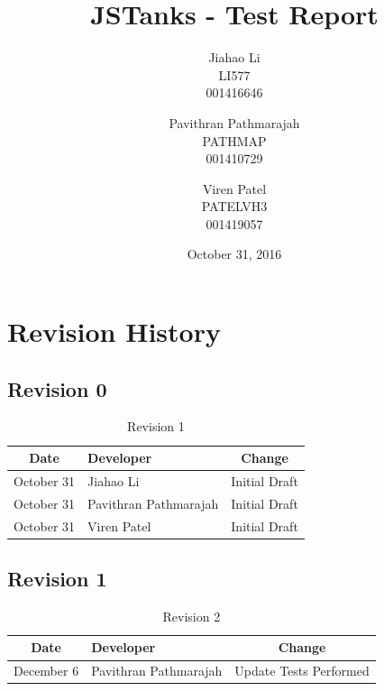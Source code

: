 \documentclass{article}
\begin{document}
\newpage
\title{JSTanks - Test Report}
\date{October 31, 2016}
\author{Jiahao Li\\LI577\\001416646\and Pavithran Pathmarajah\\PATHMAP\\
001410729 \and Viren Patel\\PATELVH3\\001419057}

\maketitle

\newpage
{}
\tableofcontents
\newpage
\listoftables

\newpage
\listoffigures

\newpage
\section{Revision History}
\subsection{Revision 0}
\begin{table}[H]
\caption{Revision 1}
	\begin{tabularx}{\textwidth}{cXc}
		\toprule
		Date & Developer & Change\\
		\midrule
		October 31&Jiahao Li &Initial Draft \\
		October 31&Pavithran Pathmarajah &Initial Draft\\
		October 31&Viren Patel  &Initial Draft\\
	\end{tabularx}
\end{table}

\subsection{Revision 1}
\begin{table}[H]
\caption{Revision 2}
	\begin{tabularx}{\textwidth}{cXc}
		\toprule
		Date & Developer & Change\\
		\midrule
		December 6&Pavithran Pathmarajah & Update Tests Performed\\
	\end{tabularx}
\end{table}
\end{document}
